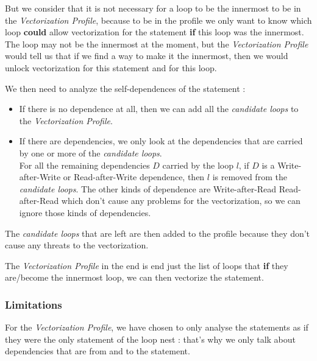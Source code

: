 \documentclass[paper=a4, fontsize=11.5pt]{scrartcl}
\numberwithin{equation}{section}        %
\numberwithin{figure}{section}          %
\numberwithin{table}{section}               %
\begin{document}
        But we consider that it is not necessary for a loop to be the innermost to be
        in the \textit{Vectorization Profile}, because to be in the profile
        we only want to know which loop \textbf{could} allow vectorization
        for the statement \textbf{if} this loop was the innermost. The loop may not be
        the innermost at the moment, but the \textit{Vectorization Profile} would tell
        us that if we find a way to make it the innermost, then we would unlock vectorization
        for this statement and for this loop.

        \bigskip

        We then need to analyze the \glspl{self-dependence} of the statement :
        \begin{itemize}
            \item If there is no dependence at all, then we can add all the 
                \textit{candidate loops} to the \textit{Vectorization Profile}.
            \item If there are dependencies, we only look at the dependencies that
                are carried by one or more of the \textit{candidate loops}.\\
                For all the remaining dependencies $D$ carried by the loop $l$,
                if $D$ is a Write-after-Write or Read-after-Write dependence, then $l$
                is removed from the \textit{candidate loops}.
                The other kinds of dependence are Write-after-Read Read-after-Read 
                which don't cause any problems for the vectorization, so we can ignore
                those kinds of dependencies.
        \end{itemize}
        The \textit{candidate loops} that are left are then added to the profile because they
        don't cause any threats to the vectorization.

        \bigskip

        The \textit{Vectorization Profile} in the end is end just the list of loops that
        \textbf{if} they are/become the innermost loop, we can then vectorize the statement.

        \subsubsection{Limitations}
        For the \textit{Vectorization Profile}, we have chosen to only analyse the statements
        as if they were the only statement of the loop nest : that's why we only talk
        about dependencies that are from and to the statement.
\end{document}
